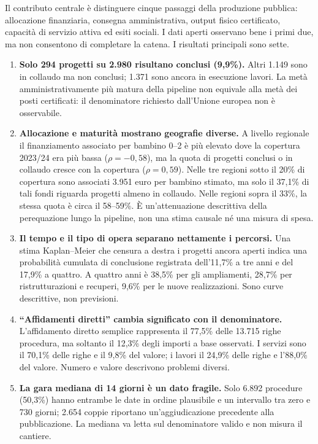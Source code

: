 \documentclass[10pt,a4paper]{article}
\begin{document}
Il contributo centrale è distinguere cinque passaggi della produzione pubblica: allocazione finanziaria, consegna amministrativa, output fisico certificato, capacità di servizio attiva ed esiti sociali. I dati aperti osservano bene i primi due, ma non consentono di completare la catena. I risultati principali sono sette.

\begin{enumerate}
  \item \textbf{Solo 294 progetti su 2.980 risultano conclusi (9,9\%).} Altri 1.149 sono in collaudo ma non conclusi; 1.371 sono ancora in esecuzione lavori. La metà amministrativamente più matura della pipeline non equivale alla metà dei posti certificati: il denominatore richiesto dall'Unione europea non è osservabile.
  \item \textbf{Allocazione e maturità mostrano geografie diverse.} A livello regionale il finanziamento associato per bambino 0--2 è più elevato dove la copertura 2023/24 era più bassa ($\rho=-0{,}58$), ma la quota di progetti conclusi o in collaudo cresce con la copertura ($\rho=0{,}59$). Nelle tre regioni sotto il 20\% di copertura sono associati 3.951 euro per bambino stimato, ma solo il 37,1\% di tali fondi riguarda progetti almeno in collaudo. Nelle regioni sopra il 33\%, la stessa quota è circa il 58--59\%. È un'attenuazione descrittiva della perequazione lungo la pipeline, non una stima causale né una misura di spesa.
  \item \textbf{Il tempo e il tipo di opera separano nettamente i percorsi.} Una stima Kaplan--Meier che censura a destra i progetti ancora aperti indica una probabilità cumulata di conclusione registrata dell'11,7\% a tre anni e del 17,9\% a quattro. A quattro anni è 38,5\% per gli ampliamenti, 28,7\% per ristrutturazioni e recuperi, 9,6\% per le nuove realizzazioni. Sono curve descrittive, non previsioni.
  \item \textbf{\textquotedblleft{}Affidamenti diretti\textquotedblright{} cambia significato con il denominatore.} L'affidamento diretto semplice rappresenta il 77,5\% delle 13.715 righe procedura, ma soltanto il 12,3\% degli importi a base osservati. I servizi sono il 70,1\% delle righe e il 9,8\% del valore; i lavori il 24,9\% delle righe e l'88,0\% del valore. Numero e valore descrivono problemi diversi.
  \item \textbf{La gara mediana di 14 giorni è un dato fragile.} Solo 6.892 procedure (50,3\%) hanno entrambe le date in ordine plausibile e un intervallo tra zero e 730 giorni; 2.654 coppie riportano un'aggiudicazione precedente alla pubblicazione. La mediana va letta sul denominatore valido e non misura il cantiere.

\end{enumerate}
\end{document}
